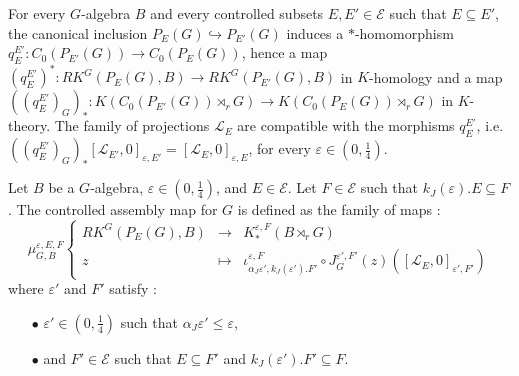 
For every $G$-algebra $B$ and every controlled subsets $E,E'\in\mathcal E$ such that $E\subseteq E'$, the canonical inclusion $P_E(G)\hookrightarrow P_{E'}(G)$ induces a $*$-homomorphism $q_E^{E'} : C_0(P_{E'}(G))\rightarrow C_0(P_{E}(G))$, hence a map $(q_E^{E'})^* : RK^G(P_E(G),B)\rightarrow RK^G(P_{E'}(G),B)$ in $K$-homology and a map $((q_E^{E'})_G)_* : K(C_0(P_{E'}(G))\rtimes_r G)\rightarrow K(C_0(P_{E}(G))\rtimes_r G)$ in $K$-theory. The family of projections $\mathcal L_E$ are compatible with the morphisms $q_E^{E'}$, i.e. $((q_E^{E'})_G)_*[\mathcal L_{E'},0]_{\varepsilon,E'} = [\mathcal L_{E},0]_{\varepsilon,E}$, for every $\varepsilon\in (0,\frac{1}{4})$.

\begin{definition}
Let $B$ be a $G$-algebra, $\varepsilon\in (0,\frac{1}{4})$, and $E\in\mathcal E$. Let $F\in \mathcal E$ such that $k_J(\varepsilon).E \subseteq F$. The controlled assembly map for $G$ is defined as the family of maps :
\[\mu_{G,B}^{\varepsilon,E,F}\left\{
\begin{array}{rcl}
RK^G(P_E(G), B) & \rightarrow & K_*^{\varepsilon, F}(B\rtimes_r G)\\
z & \mapsto & \iota_{\alpha_J\varepsilon', k_J(\varepsilon').F'}^{\varepsilon,F} \circ J_G^{\varepsilon', F'}(z)([\mathcal L_E,0]_{\varepsilon' , F'})
\end{array}\right.\]
where $\varepsilon'$ and $F'$ satisfy :
\begin{itemize}
\item[$\bullet$] $\varepsilon'\in (0,\frac{1}{4})$ such that $\alpha_J \varepsilon'\leq \varepsilon$,
\item[$\bullet$] and $F'\in\mathcal E$ such that $E\subseteq F'$ and $k_J(\varepsilon').F'\subseteq F$.
\end{itemize}
\end{definition}


